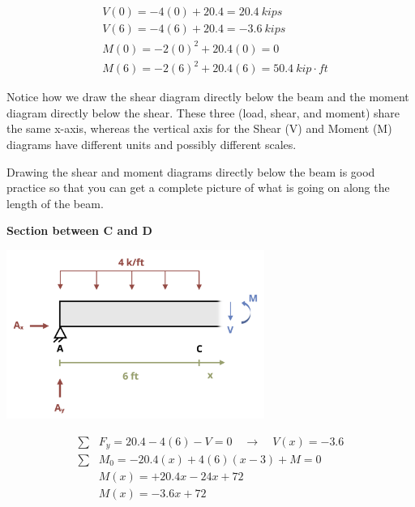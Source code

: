 \documentclass[
  letterpaper,
  DIV=11,
  numbers=noendperiod]{scrreprt}
\begin{document}
\begin{tcolorbox}
\begin{tcolorbox}
\[
\begin{aligned}
&V(0)=-4(0)+20.4=20.4{~kips} \\
&V(6)=-4(6)+20.4=-3.6{~kips}
\\
&M(0)=-2(0)^2+20.4(0)=0 \\
&M(6)=-2(6)^2+20.4(6)=50.4{~kip}\cdot{ft}
\end{aligned}
\]

Notice how we draw the shear diagram directly below the beam and the
moment diagram directly below the shear. These three (load, shear, and
moment) share the same x-axis, whereas the vertical axis for the Shear
(V) and Moment (M) diagrams have different units and possibly different
scales.

Drawing the shear and moment diagrams directly below the beam is good
practice so that you can get a complete picture of what is going on
along the length of the beam.

\textbf{Section between C and D}

\begin{center}
\includegraphics[width=3.3125in,height=\textheight]{images/CH7 PNGs/example 7.2 part 6.png}
\end{center}

\[
\begin{aligned}
\sum &F_y=20.4-4(6)-V=0 \quad\rightarrow\quad V(x)=-3.6 \\
\sum &M_0=-20.4(x)+4(6)(x-3)+M=0 \\
&M(x)=+20.4 x-24 x+72 \\
&M(x)=-3.6 x+72 \\
\end{aligned}
\]


\end{tcolorbox}
\end{tcolorbox}
\end{document}
